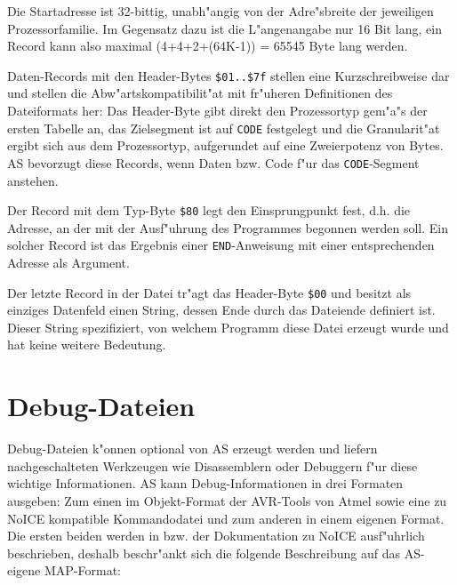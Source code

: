 \documentclass[12pt,a4paper,twoside]{report}
\newcommand{\tty}[1]{{\tt #1}}
\begin{document}
\par
Die Startadresse ist 32-bittig, unabh"angig von der Adre"sbreite der
jeweiligen Prozessorfamilie.  Im Gegensatz dazu ist die L"angenangabe
nur 16 Bit lang, ein Record kann also maximal (4+4+2+(64K-1)) = 65545
Byte lang werden.
\par
Daten-Records mit den Header-Bytes \verb!$01..$7f! stellen eine
Kurzschreibweise dar und stellen die Abw"artskompatibilit"at mit fr"uheren
Definitionen des Dateiformats her: Das Header-Byte gibt direkt den
Prozessortyp gem"a"s der ersten Tabelle an, das Zielsegment ist auf \tty{CODE}
festgelegt und die Granularit"at ergibt sich aus dem Prozessortyp,
aufgerundet auf eine Zweierpotenz von Bytes.  AS bevorzugt diese Records,
wenn Daten bzw. Code f"ur das \tty{CODE}-Segment anstehen.
\par
Der Record mit dem Typ-Byte \verb!$80! legt den Einsprungpunkt fest, d.h.
die Adresse, an der mit der Ausf"uhrung des Programmes begonnen werden
soll.  Ein solcher Record ist das Ergebnis einer \tty{END}-Anweisung mit
einer entsprechenden Adresse als Argument.
\par
Der letzte Record in der Datei tr"agt das Header-Byte \verb!$00! und besitzt
als einziges Datenfeld einen String, dessen Ende durch das Dateiende
definiert ist.  Dieser String spezifiziert, von welchem Programm diese
Datei erzeugt wurde und hat keine weitere Bedeutung.


\section{Debug-Dateien}\label{SectDebugFormat}

Debug-Dateien k"onnen optional von AS erzeugt werden und liefern
nachgeschalteten Werkzeugen wie Disassemblern oder Debuggern f"ur diese
wichtige Informationen.  AS kann Debug-Informationen in drei Formaten
ausgeben: Zum einen im Objekt-Format der AVR-Tools von Atmel sowie eine zu
NoICE kompatible Kommandodatei und zum anderen in einem eigenen Format.
Die ersten beiden werden in \cite{AVRObj} bzw. der Dokumentation zu
NoICE ausf"uhrlich beschrieben, deshalb beschr"ankt sich die folgende
Beschreibung auf das AS-eigene MAP-Format:
\end{document}
